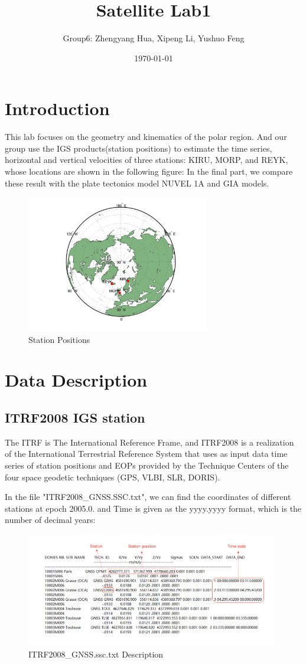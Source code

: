 \documentclass{article}
\title{Satellite Lab1}
\author{Group6: Zhengyang Hua, Xipeng Li, Yushuo Feng}
\date{\today}
\begin{document}
\maketitle
\tableofcontents

\section{Introduction}
This lab focuses on the geometry and kinematics of the polar region. 
And our group use the IGS products(station positions) to estimate the time series, horizontal and vertical velocities of three stations: KIRU, MORP, and REYK, whose locations are shown in the following figure:
In the final part, we compare these result with the plate tectonics model NUVEL 1A and GIA models.
\begin{figure}[htbp]
  \centering
  \includegraphics[width=8cm]{../result/point/Point.jpg}
  \captionsetup{skip=0.2cm}
  \caption{Station Positions}
  \label{Intro:station}
\end{figure}

\section{Data Description}
\subsection{ITRF2008 IGS station}
The ITRF is The International Reference Frame,  
and ITRF2008 is a realization of the International Terrestrial Reference System 
that uses as input data time series of station positions and EOPs provided by the Technique Centers of the four space geodetic techniques (GPS, VLBI, SLR, DORIS).

In the file "ITRF2008\_GNSS.SSC.txt", we can find the coordinates of different stations at epoch 2005.0.
 and Time is given as the yyyy.yyyy format, which is the number of decimal years:
\begin{figure}[htbp]
    \centering
    \includegraphics[width=11cm]{./source/ITRF2008.png}
    \caption{ITRF2008\_GNSS.ssc.txt Description}
    \label{fig:ITRF2008}
\end{figure}
\end{document}
